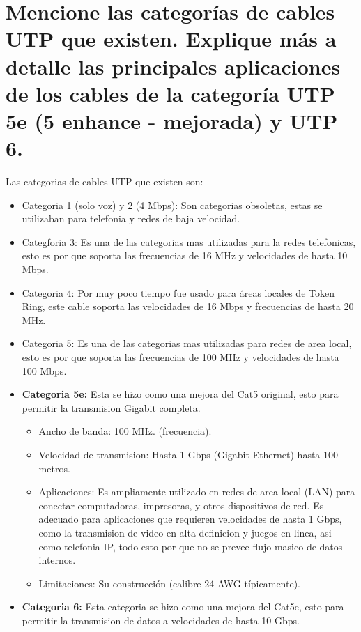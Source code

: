 \documentclass[a4paper,12pt]{article}
\begin{document}
\newpage
\section{Mencione las categorías de cables UTP que existen. Explique más a detalle las principales aplicaciones de los cables de la categoría UTP 5e (5 enhance - mejorada) y UTP 6.}

Las categorias de cables UTP que existen son:
\begin{itemize}
    \item Categoria 1 (solo voz) y 2 (4 Mbps): Son categorias obsoletas, estas se utilizaban para telefonia y redes de baja velocidad.
    \item Categforia 3: Es una de las categorias mas utilizadas para la redes telefonicas, esto es por que soporta las frecuencias de 16 MHz y velocidades de hasta 10 Mbps.
    \item Categoria 4: Por muy poco tiempo fue usado para áreas locales de Token Ring, este cable soporta las velocidades de 16 Mbps y frecuencias de hasta 20 MHz.
    \item Categoria 5: Es una de las categorias mas utilizadas para redes de area local, esto es por que soporta las frecuencias de 100 MHz y velocidades de hasta 100 Mbps.
    \item \textbf{Categoria 5e:} Esta se hizo como una mejora del Cat5 original, esto para permitir la transmision Gigabit completa.
    \begin{itemize}
        \item Ancho de banda: 100 MHz. (frecuencia).
        \item Velocidad de transmision: Hasta 1 Gbps (Gigabit Ethernet) hasta 100 metros.
        \item Aplicaciones: Es ampliamente utilizado en redes de area local (LAN) para conectar computadoras, impresoras, y otros dispositivos de red. Es adecuado para aplicaciones que requieren velocidades de hasta 1 Gbps, como la transmision de video en alta definicion y juegos en linea, asi como telefonia IP, todo esto por que no se prevee flujo masico de datos internos.
        \item Limitaciones: Su construcción (calibre 24 AWG típicamente).
    \end{itemize}
    \item \textbf{Categoria 6:} Esta categoria se hizo como una mejora del Cat5e, esto para permitir la transmision de datos a velocidades de hasta 10 Gbps.
    \begin{itemize}

\end{itemize}
\end{itemize}
\end{document}
